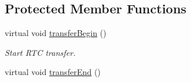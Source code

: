 \subsection*{Protected Member Functions}
\begin{DoxyCompactItemize}
\item 
virtual void \hyperlink{class_d_s1302_a0aa42be930e0635baf0d4976cb991a42}{transfer\+Begin} ()\hypertarget{class_d_s1302_a0aa42be930e0635baf0d4976cb991a42}{}\label{class_d_s1302_a0aa42be930e0635baf0d4976cb991a42}

\begin{DoxyCompactList}\small\item\em Start R\+TC transfer. \end{DoxyCompactList}\item 
virtual void \hyperlink{class_d_s1302_af36b0bc4707aa63a323c6de803194e91}{transfer\+End} ()\hypertarget{class_d_s1302_af36b0bc4707aa63a323c6de803194e91}{}\label{class_d_s1302_af36b0bc4707aa63a323c6de803194e91}


\end{DoxyCompactItemize}
